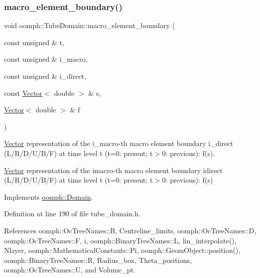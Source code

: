 \mbox{\label{classoomph_1_1TubeDomain_a1f16dde7ad082e2557dff9c737dae6c0}} 
\subsubsection{\texorpdfstring{macro\+\_\+element\+\_\+boundary()}{macro\_element\_boundary()}}
{\footnotesize\ttfamily void oomph\+::\+Tube\+Domain\+::macro\+\_\+element\+\_\+boundary (\begin{DoxyParamCaption}\item[{const unsigned \&}]{t,  }\item[{const unsigned \&}]{i\+\_\+macro,  }\item[{const unsigned \&}]{i\+\_\+direct,  }\item[{const \hyperlink{classoomph_1_1Vector}{Vector}$<$ double $>$ \&}]{s,  }\item[{\hyperlink{classoomph_1_1Vector}{Vector}$<$ double $>$ \&}]{f }\end{DoxyParamCaption})\hspace{0.3cm}{\ttfamily [virtual]}}



\hyperlink{classoomph_1_1Vector}{Vector} representation of the i\+\_\+macro-\/th macro element boundary i\+\_\+direct (L/\+R/\+D/\+U/\+B/F) at time level t (t=0\+: present; t$>$0\+: previous)\+: f(s). 

\hyperlink{classoomph_1_1Vector}{Vector} representation of the imacro-\/th macro element boundary idirect (L/\+R/\+D/\+U/\+B/F) at time level t (t=0\+: present; t$>$0\+: previous)\+: f(s) 

Implements \hyperlink{classoomph_1_1Domain_a95f3e00d28ea37e6c4d3027bfac91096}{oomph\+::\+Domain}.



Definition at line 190 of file tube\+\_\+domain.\+h.



References oomph\+::\+Oc\+Tree\+Names\+::B, Centreline\+\_\+limits, oomph\+::\+Oc\+Tree\+Names\+::D, oomph\+::\+Oc\+Tree\+Names\+::F, i, oomph\+::\+Binary\+Tree\+Names\+::L, lin\+\_\+interpolate(), Nlayer, oomph\+::\+Mathematical\+Constants\+::\+Pi, oomph\+::\+Geom\+Object\+::position(), oomph\+::\+Binary\+Tree\+Names\+::R, Radius\+\_\+box, Theta\+\_\+positions, oomph\+::\+Oc\+Tree\+Names\+::U, and Volume\+\_\+pt.



